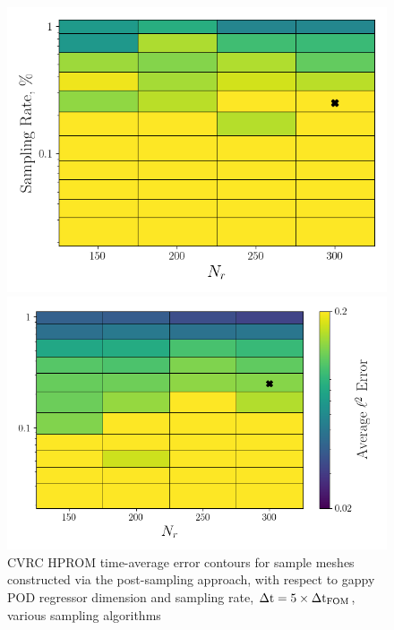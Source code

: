 \begin{figure}
	\begin{minipage}{0.46\linewidth}
		\includegraphics[width=0.99\linewidth]{Chapters/HPROMResults/Images/cvrc/dof_samp/err_contour_gnat1_dof_dt5e-7.png}
	\end{minipage}
	\begin{minipage}{0.53\linewidth}
		\includegraphics[width=0.99\linewidth]{Chapters/HPROMResults/Images/cvrc/dof_samp/err_contour_gnat2_dof_dt5e-7.png}
	\end{minipage}
	\caption{\label{fig:cvrcSampledROMErrContourDOFDt5e-7}CVRC HPROM time-average error contours for sample meshes constructed via the post-sampling approach, with respect to gappy POD regressor dimension and sampling rate, $\Delta \text{t} = 5 \times \Delta \text{t}_{\text{FOM}}$, various sampling algorithms}
\end{figure}

